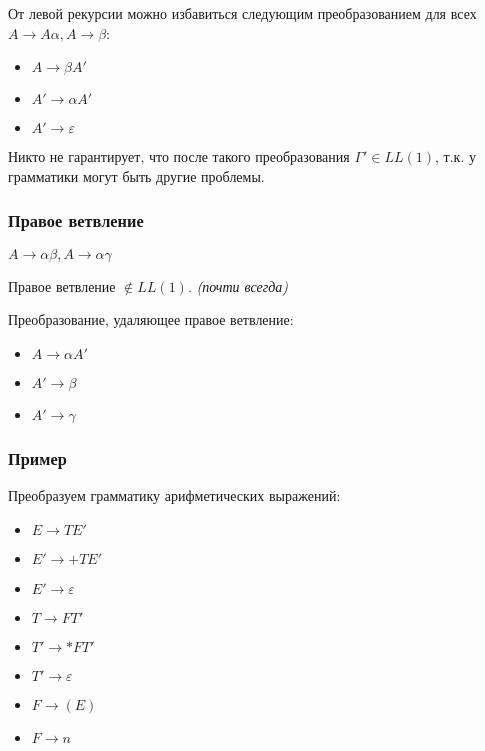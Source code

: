 От левой рекурсии можно избавиться следующим преобразованием для всех \(A \to A\alpha, A \to \beta\):
\begin{itemize}
    \item \(A \to \beta A'\)
    \item \(A' \to \alpha A'\)
    \item \(A' \to \varepsilon\)
\end{itemize}

Никто не гарантирует, что после такого преобразования \(\Gamma' \in LL(1)\), т.к. у грамматики могут быть другие проблемы.

\subsubsection{Правое ветвление}

\begin{definition}
    \(A \to \alpha \beta, A \to \alpha \gamma\)
\end{definition}

\begin{statement}
    Правое ветвление \(\notin LL(1)\). \textit{(почти всегда)}
\end{statement}

Преобразование, удаляющее правое ветвление:
\begin{itemize}
    \item \(A \to \alpha A'\)
    \item \(A' \to \beta\)
    \item \(A' \to \gamma\)
\end{itemize}

\subsubsection{Пример}

Преобразуем грамматику арифметических выражений:

\begin{itemize}
    \item \(E \to TE'\)
    \item \(E' \to + TE'\)
    \item \(E' \to \varepsilon\)
    \item \(T \to FT'\)
    \item \(T' \to *FT'\)
    \item \(T' \to \varepsilon\)
    \item \(F \to (E)\)
    \item \(F \to n\)
\end{itemize}

